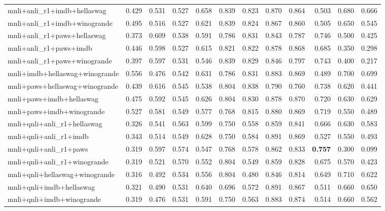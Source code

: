\begin{table}[t]
\begin{tabular}{lrrrrrrrrrrr}
    mnli+anli\_r1+imdb+hellaswag & 0.429 & 0.531 & 0.527 & 0.658 & 0.839 & 0.823 & 0.870 & 0.864 & 0.503 & 0.680 & 0.666 \\
    mnli+anli\_r1+imdb+winogrande & 0.495 & 0.516 & 0.527 & 0.621 & 0.839 & 0.824 & 0.867 & 0.860 & 0.505 & 0.650 & 0.545 \\
    mnli+anli\_r1+paws+hellaswag & 0.373 & 0.609 & 0.538 & 0.591 & 0.786 & 0.831 & 0.843 & 0.787 & 0.746 & 0.500 & 0.425 \\
    mnli+anli\_r1+paws+imdb & 0.446 & 0.598 & 0.527 & 0.615 & 0.821 & 0.822 & 0.878 & 0.868 & 0.685 & 0.350 & 0.298 \\
    mnli+anli\_r1+paws+winogrande & 0.397 & 0.597 & 0.531 & 0.546 & 0.839 & 0.829 & 0.846 & 0.797 & 0.743 & 0.400 & 0.217 \\
    mnli+imdb+hellaswag+winogrande & 0.556 & 0.476 & 0.542 & 0.631 & 0.786 & 0.831 & 0.883 & 0.869 & 0.489 & 0.700 & 0.699 \\
    mnli+paws+hellaswag+winogrande & 0.439 & 0.616 & 0.545 & 0.538 & 0.804 & 0.838 & 0.790 & 0.760 & 0.738 & 0.620 & 0.441 \\
    mnli+paws+imdb+hellaswag & 0.475 & 0.592 & 0.545 & 0.626 & 0.804 & 0.830 & 0.878 & 0.870 & 0.720 & 0.630 & 0.629 \\
    mnli+paws+imdb+winogrande & 0.527 & 0.581 & 0.549 & 0.577 & 0.768 & 0.815 & 0.880 & 0.869 & 0.719 & 0.550 & 0.489 \\
    mnli+qnli+anli\_r1+hellaswag & 0.326 & 0.541 & 0.563 & 0.599 & 0.750 & 0.558 & 0.859 & 0.841 & 0.666 & 0.630 & 0.583 \\
    mnli+qnli+anli\_r1+imdb & 0.343 & 0.514 & 0.549 & 0.628 & 0.750 & 0.584 & 0.891 & 0.869 & 0.527 & 0.550 & 0.493 \\
    mnli+qnli+anli\_r1+paws & 0.319 & 0.597 & 0.574 & 0.547 & 0.768 & 0.578 & 0.862 & 0.833 & \textbf{0.757} & 0.300 & 0.099 \\
    mnli+qnli+anli\_r1+winogrande & 0.319 & 0.521 & 0.570 & 0.552 & 0.804 & 0.549 & 0.859 & 0.828 & 0.675 & 0.570 & 0.423 \\
    mnli+qnli+hellaswag+winogrande & 0.316 & 0.492 & 0.534 & 0.556 & 0.804 & 0.480 & 0.846 & 0.814 & 0.649 & 0.710 & 0.622 \\
    mnli+qnli+imdb+hellaswag & 0.321 & 0.490 & 0.531 & 0.640 & 0.696 & 0.572 & 0.891 & 0.867 & 0.511 & 0.660 & 0.650 \\
    mnli+qnli+imdb+winogrande & 0.319 & 0.476 & 0.531 & 0.591 & 0.750 & 0.563 & 0.883 & 0.874 & 0.514 & 0.660 & 0.562 \\

\end{tabular}
\end{table}
